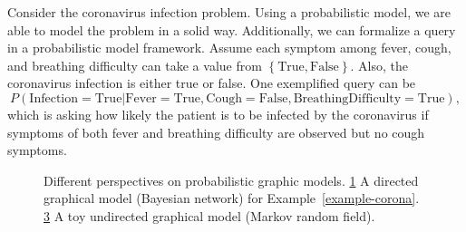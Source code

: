\begin{example}\label{example-corona}
  Consider the coronavirus infection problem. Using a probabilistic model, we are able to model the problem in a solid way. Additionally, we can formalize a query in a probabilistic model framework. Assume each symptom among fever, cough, and breathing difficulty can take a value from $\left\{ \mathrm{True}, \mathrm{False} \right\}$. Also, the coronavirus infection is either true or false. One exemplified query can be
  \begin{equation}
    P(\mathrm{Infection} = \mathrm{True} | \mathrm{Fever} = \mathrm{True}, \mathrm{Cough} = \mathrm{False}, \mathrm{Breathing Difficulty}= \mathrm{True}), \nonumber
  \end{equation}
  which is asking how likely the patient is to be infected by the coronavirus if symptoms of both fever and breathing difficulty are observed but no cough symptoms.

\end{example}

\begin{figure}[!t]
  \begin{subfigure}{.4\textwidth}
    \caption{}
    \label{fig:dag-coronavirus}
  \end{subfigure}\hspace{2.5cm}
  \begin{subfigure}{0.3\textwidth}
    \caption{}
    \label{fig:mrf-communication}
  \end{subfigure}
  \caption{Different perspectives on probabilistic graphic models. \ref{fig:dag-coronavirus} A directed graphical model (Bayesian network) for Example~\ref{example-corona}. \ref{fig:mrf-communication} A toy undirected graphical model (Markov random field).}
\end{figure}


